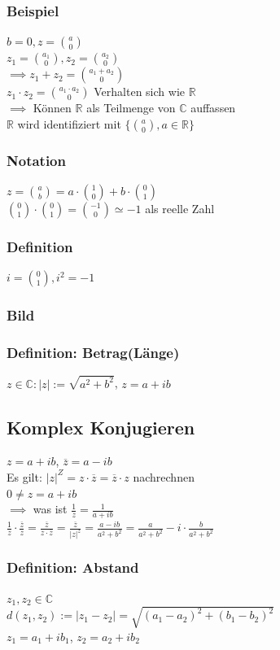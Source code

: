 \documentclass[fleqn]{scrbook}
\newcommand{\R}{\mathbb{R}}
\begin{document}
\subsubsection{Beispiel}
$b=0,z=\binom{a}{0}$\\$z_1=\binom{a_1}{0},z_2 = \binom{a_2}{0}$\\
$\implies z_1 + z_2 = \binom{a_1+a_2}{0}$\\
$z_1  \cdot  z_2 = \binom{a_1  \cdot  a_2}{0}$ Verhalten sich wie $\R$\\
$\implies$ Können $\R$ als Teilmenge von $\mathbb{C}$ auffassen\\
$\R$ wird identifiziert mit $\{\binom{a}{0}, a \in \R\}$
\subsubsection{Notation}
$z=\binom{a}{b}=a \cdot \binom{1}{0}+b \cdot \binom{0}{1}$\\
$\binom{0}{1}  \cdot  \binom{0}{1} = \binom{-1}{0} \simeq -1$ als reelle Zahl
\subsubsection{Definition} $i = \binom{0}{1}, i^2 = -1$
\subsubsection{Bild}
\subsubsection{Definition: Betrag(Länge)} 
$z \in \mathbb{C}:|z|:=\sqrt{a^2 + b^2}$, $z=a+ib$
\subsection{Komplex Konjugieren} $z = a+ib$, $\overline{z} = a - ib$\\
Es gilt: $|z|^Z = z  \cdot  \overline{z} = \overline{z}  \cdot  z$ nachrechnen\\
$0 \neq z = a + ib$\\
$\implies$ was ist $\frac{1}{z} = \frac{1}{a+ib}$\\
$\frac{1}{z}  \cdot  \frac{\overline{z}}{z} = \frac{\overline{z}}{z  \cdot  \overline{z}} = \frac{\overline{z}}{|z|^z} = \frac{a-ib}{a^2 + b^2} = \frac{a}{a^2 + b^2} - i \cdot \frac{b}{a^2 + b^2}$
\subsubsection{Definition: Abstand} $z_1, z_2 \in \mathbb{C}$\\
$d(z_1,z_2) := |z_1 - z_2| = \sqrt{(a_1 - a_2)^2 + (b_1 - b_2)^2}$\\
$z_1 = a_1 + ib_1$, $z_2 = a_2 + ib_2$
\end{document}
